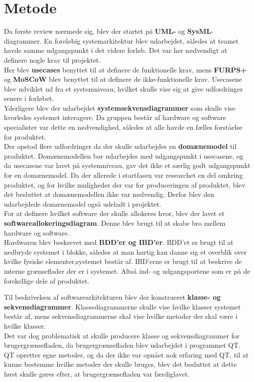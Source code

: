 \section{Metode}

Da første review nærmede sig, blev der startet på \textbf{UML-} og \textbf{SysML}-diagrammer. En foreløbig systemarkitektur blev udarbejdet, således at teamet havde samme udgangspunkt i det videre forløb. Det var her nødvendigt at definere nogle krav til projektet.\\

Her blev \textbf{usecases} benyttet til at definere de funktionelle krav, mens \textbf{FURPS+} og \textbf{MoSCoW} blev benyttet til at definere de ikke-funktionelle krav. Usecasene blev udviklet ud fra et systemniveau, hvilket skulle vise sig at give udfordringer senere i forløbet.\\

Yderligere blev der udarbejdet \textbf{systemsekvensdiagrammer} som skulle vise hvorledes systemet interagere. Da gruppen består af hardware og software specialister var dette en nødvendighed, således at alle havde en fælles forståelse for produktet.\\

Der opstod flere udfordringer da der skulle udarbejdes en \textbf{domænemodel} til produktet. Domænemodellen bør udarbejdes med udgangspunkt i usecasene, og da usecasene var lavet på systemniveau, gav det ikke et særlig godt udgangspunkt for en domænemodel. Da der allerede i startfasen var researchet en del omkring produktet, og for hvilke muligheder der var for produceringen af produktet, blev det besluttet at domænemodellen ikke var nødvendig. Derfor blev den udarbejdede domænemodel også udeladt i projektet.\\
 
For at definere hvilket software der skulle allokeres hvor, blev der lavet et \textbf{softwareallokeringsdiagram}. Denne blev brugt til at skabe bro mellem hardware og software.\\

Hardwaren blev beskrevet med \textbf{BDD’er og IBD’er}. BDD’et er brugt til at nedbryde systemet i blokke, således at man hurtig kan danne sig et overblik over hvilke fysiske elementer,systemet består af. 
IBD’erne er brugt til at beskrive de interne grænseflader der er i systemet. Altså ind- og udgangsportene som er på de forskellige dele af produktet.

Til beskrivelsen af softwarearkitekturen blev der konstrueret \textbf{klasse- og sekvensdiagrammer}. Klassediagrammerne skulle vise hvilke klasser systemet består af, mens sekvensdiagrammerne skal vise hvilke metoder der skal være i hvilke klasser. \\

Det var dog problematisk at skulle producere klasse og sekvensdiagrammer for brugergrænsefladen, da brugergrænsefladen blev udarbejdet i programmet QT. QT opretter egne metoder, og da der ikke var opnået nok erfaring med QT, til at kunne bestemme hvilke metoder der skulle bruges, blev det besluttet at dette først skulle gøres efter, at brugergrænsefladen var færdiglavet.
